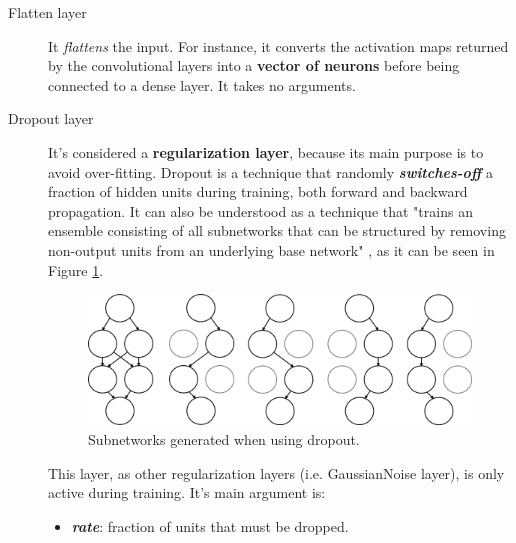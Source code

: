 \begin{description}
	\item[Flatten layer] It \textit{flattens} the input. For instance, it converts the activation maps returned by the convolutional layers into a \textbf{vector of neurons} before being connected to a dense layer. It takes no arguments.
\end{description}

\begin{description}
	\item[Dropout layer] It's considered a \textbf{regularization layer}, because its main purpose is to avoid over-fitting. Dropout \cite{srivastava2014dropout} is a technique that randomly \textbf{\textit{switches-off}} a fraction of hidden units during training, both forward and backward propagation. It can also be understood as a technique that "trains an ensemble consisting of all subnetworks that can be structured by removing non-output units from an underlying base network" \cite{Goodfellow-et-al-2016}, as it can be seen in Figure \ref{fig:dropout}.

	\begin{figure}
		\centering
		\includegraphics[width=1\linewidth, keepaspectratio]{figures/dropout.png}
		\caption{Subnetworks generated when using dropout.}
		\label{fig:dropout}
	\end{figure}	

	 This layer, as other regularization layers (i.e. GaussianNoise layer), is only active during training. It's main argument is:
	\begin{itemize}
		\item \textbf{\textit{rate}}: fraction of units that must be dropped.
	\end{itemize}
	
\end{description}

